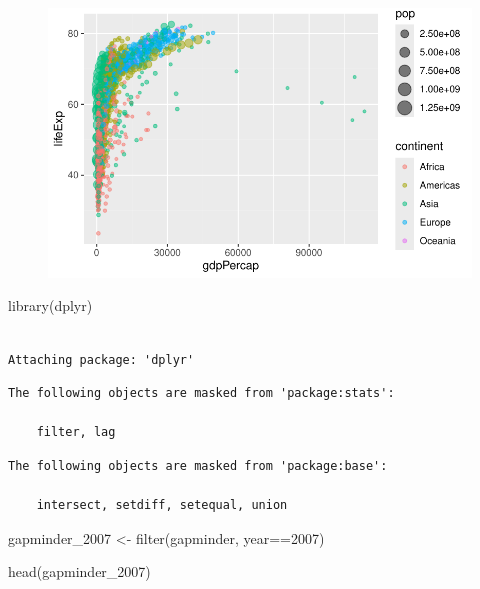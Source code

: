 \documentclass[
  letterpaper,
  DIV=11,
  numbers=noendperiod]{scrartcl}
\newenvironment{Shaded}{\begin{snugshade}}{\end{snugshade}}
\newcommand{\DecValTok}[1]{\textcolor[rgb]{0.68,0.00,0.00}{#1}}
\newcommand{\FunctionTok}[1]{\textcolor[rgb]{0.28,0.35,0.67}{#1}}
\newcommand{\NormalTok}[1]{\textcolor[rgb]{0.00,0.23,0.31}{#1}}
\newcommand{\OtherTok}[1]{\textcolor[rgb]{0.00,0.23,0.31}{#1}}
\newcommand{\SpecialCharTok}[1]{\textcolor[rgb]{0.37,0.37,0.37}{#1}}
\begin{document}
\begin{figure}[H]

{\centering \includegraphics{./-class05_files/figure-pdf/unnamed-chunk-24-1.pdf}

}

\end{figure}

\begin{Shaded}
\begin{Highlighting}[]
\FunctionTok{library}\NormalTok{(dplyr)}
\end{Highlighting}
\end{Shaded}

\begin{verbatim}

Attaching package: 'dplyr'
\end{verbatim}

\begin{verbatim}
The following objects are masked from 'package:stats':

    filter, lag
\end{verbatim}

\begin{verbatim}
The following objects are masked from 'package:base':

    intersect, setdiff, setequal, union
\end{verbatim}

\begin{Shaded}
\begin{Highlighting}[]
\NormalTok{gapminder\_2007 }\OtherTok{\textless{}{-}} \FunctionTok{filter}\NormalTok{(gapminder, year}\SpecialCharTok{==}\DecValTok{2007}\NormalTok{)}

\FunctionTok{head}\NormalTok{(gapminder\_2007)}
\end{Highlighting}
\end{Shaded}
\end{document}
